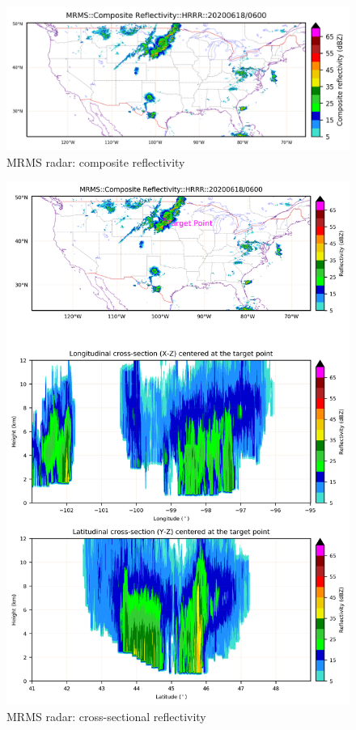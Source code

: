 \documentclass[11pt,fleqn]{report}              %
\begin{document}
\begin{enumerate}
\begin{figure}[ht!]
  \centering
  \includegraphics[width=\linewidth]{fv3_mrms_comRefl_HRRR_20200618_0600.png}
  \caption{MRMS radar: composite reflectivity}
  \label{fig:py_mrms_composite}
\end{figure}

\clearpage

\begin{figure}[H]
  \centering
  \includegraphics[width=0.8\linewidth]{fv3_mrms_xzRefl_HRRR_20200618_0600.png}
  \caption{MRMS radar: cross-sectional reflectivity}
  \label{fig:py_mrms_xsecton}
\end{figure}


\end{enumerate}
\end{document}
